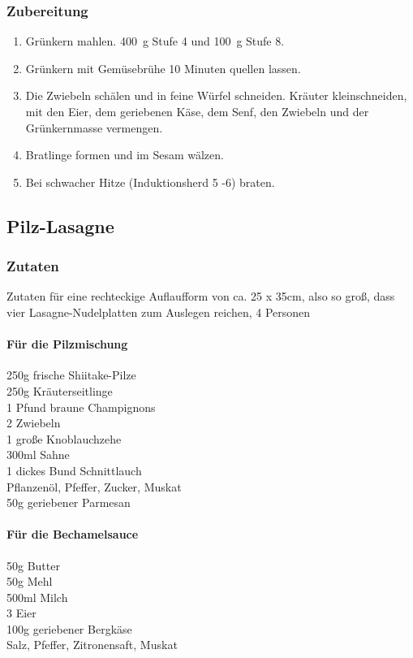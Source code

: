 \subsubsection*{Zubereitung}
\begin{enumerate}
    \item Grünkern mahlen. 400~g Stufe 4 und 100~g Stufe 8.
    \item Grünkern mit Gemüsebrühe 10 Minuten quellen lassen.
    \item Die Zwiebeln schälen und in feine Würfel schneiden. Kräuter kleinschneiden, mit den Eier, dem geriebenen Käse, dem Senf, den Zwiebeln und der Grünkernmasse vermengen.
    \item Bratlinge formen und im Sesam wälzen.
    \item Bei schwacher Hitze (Induktionsherd 5 -6) braten.
\end{enumerate}


\subsection{Pilz-Lasagne}

\subsubsection*{Zutaten} 
Zutaten für eine rechteckige Auflaufform von ca. 25 x 35cm, also so groß, dass vier Lasagne-Nudelplatten zum Auslegen reichen, 4 Personen

\paragraph*{Für die Pilzmischung}

250g frische Shiitake-Pilze  \\
250g Kräuterseitlinge \\
1 Pfund braune Champignons  \\
2 Zwiebeln \\
1 große Knoblauchzehe \\
300ml Sahne \\
1 dickes Bund Schnittlauch \\
Pflanzenöl, Pfeffer, Zucker, Muskat \\
50g geriebener Parmesan

\paragraph*{Für die Bechamelsauce}
50g Butter\\
50g Mehl\\
500ml Milch\\
3 Eier\\
100g geriebener Bergkäse\\
Salz, Pfeffer, Zitronensaft, Muskat

